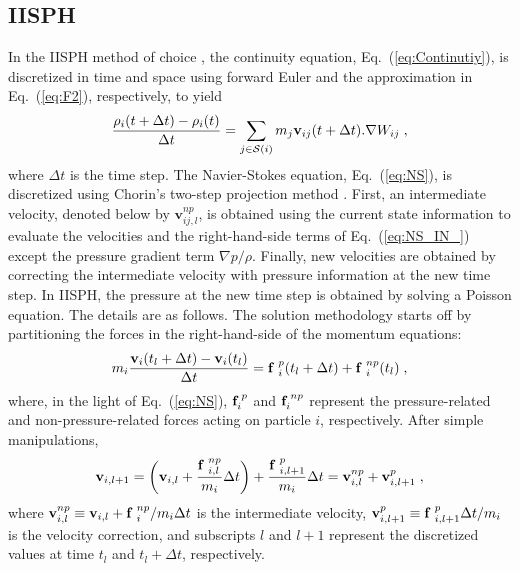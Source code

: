 \subsection{IISPH}
\label{subsec:IISPH}
In the IISPH method of choice \cite{ihmsen2014implicit}, the continuity equation, Eq.~(\ref{eq:Continutiy}), is discretized in time and space using forward Euler and the approximation in Eq.~(\ref{eq:F2}), respectively, to yield
\begin{equation}\label{eq:rhocontinuity}
\frac{\rho_i(t+\Delta t)-\rho_i(t)}{\Delta t}=\sum_{j \in {\cal S}(i)} m_j \mathbf v_{ij}(t+\Delta t). \nabla W_{ij}\;,
\end{equation}
where $\Delta t$ is the time step. The Navier-Stokes equation, Eq.~(\ref{eq:NS}), is discretized using Chorin's two-step projection method \cite{chorin1968numerical}. First, an intermediate velocity, denoted below by $\mathbf v_{ij,l}^{np}$, is obtained using the current state information to evaluate the velocities and the right-hand-side terms of Eq.~(\ref{eq:NS_IN_}) except the pressure gradient term $\nabla p/\rho$. Finally, new velocities are obtained by correcting the intermediate velocity with pressure information at the new time step. In IISPH, the pressure at the new time step is obtained by solving a Poisson equation. The details are as follows. The solution methodology starts off by partitioning the forces in the right-hand-side of the momentum equations:
\begin{equation}\label{eq:continuityDes}
m_i \frac{\mathbf v_i(t_l+\Delta t)-\mathbf v_i(t_l)}{\Delta t}={\bf f}\;^p_i(t_l+\Delta t)+{\bf f}\;^{np}_i(t_l)\;,
\end{equation}
where, in the light of Eq.~(\ref{eq:NS}), ${\bf f}_i^{\:p}$ and ${\bf f}_i^{\:np}$ represent the pressure-related and non-pressure-related forces acting on particle $i$, respectively. After simple manipulations,
\begin{equation}\label{eq:seconLaw}
\mathbf v_{i,l+1}=\bigg(\mathbf v_{i,l}+ \frac{{\bf f}\;^{np}_{i,l}}{ m_i}\Delta t\bigg)+ \frac{{\bf f}\;^{p}_{i,l+1}}{ m_i}\Delta t=\mathbf v^{np}_{i,l}+\mathbf v^{p}_{i,l+1}\;,
\end{equation}
where $\mathbf v^{np}_{i,l} \equiv \mathbf v_{i,l}+ {{\bf f}\;^{np}_i}/{ m_i}\Delta t$ is the intermediate velocity, $\mathbf v^{p}_{i,l+1} \equiv {{\bf f}\;^{p}_{i,l+1}}\Delta t/{ m_i}$ is the velocity correction, and subscripts $l$ and $l+1$ represent the discretized values at time $t_l$ and $t_l+\Delta t$, respectively. 

